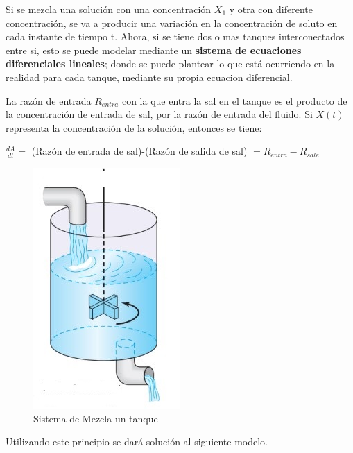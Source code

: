 \documentclass[titlepage]{article}
\begin{document}
            Si se mezcla una solución con una concentración $X_1$ y otra con diferente concentración, se va a producir una variación en la concentración de soluto en cada instante de tiempo t. Ahora, si se tiene dos o mas tanques interconectados entre si, esto se puede modelar mediante un \textbf{sistema de ecuaciones diferenciales lineales}; donde se puede plantear lo que está ocurriendo en la realidad para cada tanque, mediante su propia ecuacion diferencial.\vspace{0.3cm}
            
            
            La razón de entrada $R_{entra}$ con la que entra la sal en el tanque es el producto de la concentración de entrada de sal, por la razón de entrada del fluido. Si $X(t)$ representa la concentración de la solución, entonces se tiene:
            
                \begin{center}
                    $\frac{dA}{dt} =$ (Razón de entrada de sal)-(Razón de salida de sal) $= R_{entra} - R_{sale}$
                \end{center}\vspace{0.3cm}
                \begin{figure}
                \begin{center}
                    \includegraphics[scale=0.4]{Mezclas}  
                \caption{Sistema de Mezcla un tanque}
                \end{center}
                \end{figure}
                
            Utilizando este principio se dará solución al siguiente modelo.\cite{Zill2002d}
            \newpage
            
\end{document}
